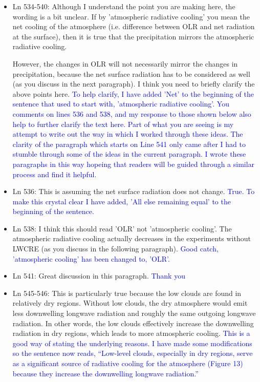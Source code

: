 \documentclass[draft]{agujournal2019}
\begin{document}
\begin{itemize}
  \item Ln 534-540: Although I understand the point you are making here, the wording is a bit unclear. If by 'atmospheric radiative cooling' you mean the net cooling of the atmosphere (i.e. difference between OLR and net radiation at the surface), then it is true that the precipitation mirrors the atmospheric radiative cooling.  
  
However, the changes in OLR will not necessarily mirror the changes in precipitation, because the net surface radiation has to be considered as well (as you discuss in the next paragraph). 
%
I think you need to briefly clarify the above points here.
  \textcolor{blue}{To help clarify, I have added 'Net' to the beginning of the sentence that used to start with, 'atmospheric radiative cooling'.  You comments on lines 536 and 538, and my response to those shown below also help to further clarify the text here.
  Part of what you are seeing is my attempt to write out the way in which I worked through these ideas.  The clarity of the paragraph which starts on Line 541 only came after I had to stumble through some of the ideas in the current paragraph.  I 
  wrote these paragraphs in this way  
  hopeing that readers will be guided through a similar process and find it helpful.}
  
  \item Ln 536: This is assuming the net surface radiation does not change.
  \textcolor{blue}{True.  To make this crystal clear I have added, 'All else remaining equal' to the beginning of the sentence.}
  
  \item Ln 538: I think this should read 'OLR' not 'atmospheric cooling'. The atmospheric radiative cooling actually decreases in the experiments without LWCRE (as you discuss in the following paragraph). 
  \textcolor{blue}{Good catch, 'atmospheric cooling' has been changed to, 'OLR'.}
  
  \item Ln 541: Great discussion in this paragraph.  
  \textcolor{blue}{Thank you}
  
  \item Ln 545-546: This is particularly true because the low clouds are found in relatively dry regions. Without low clouds, the dry atmosphere would emit less downwelling longwave radiation and roughly the same outgoing longwave radiation. In other words, the low clouds effectively increase the downwelling radiation in dry regions, which leads to more atmospheric cooling.   
  \textcolor{blue}{This is a good way of stating the underlying reasons.  I have made some modifications so the sentence now 
  reads, ``Low-level clouds, especially in dry regions, serve as a significant source of  radiative cooling for the atmosphere (Figure 
  13) because they increase the downwelling longwave radiation.''}
  

\end{itemize}
\end{document}
